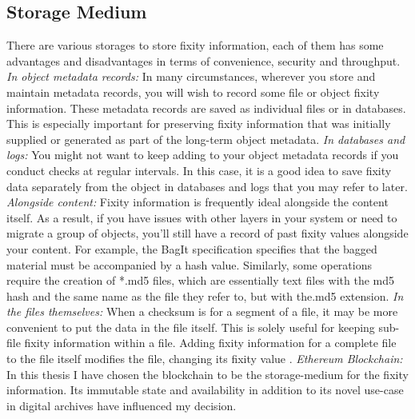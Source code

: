 \subsection{Storage Medium}
\label{sec:storage-medium}
There are various storages to store fixity information, each of them has some advantages and disadvantages in terms of convenience, security and throughput.
\newline \textit{In object metadata records:} In many circumstances, wherever you store and maintain metadata records, you will wish to record some file or object fixity information. These metadata records are saved as individual files or in databases. This is especially important for preserving fixity information that was initially supplied or generated as part of the long-term object metadata. 
\newline \textit{In databases and logs:} You might not want to keep adding to your object metadata records if you conduct checks at regular intervals. In this case, it is a good idea to save fixity data separately from the object in databases and logs that you may refer to later.
\newline \textit{Alongside content:} Fixity information is frequently ideal alongside the content itself. As a result, if you have issues with other layers in your system or need to migrate a group of objects, you'll still have a record of past fixity values alongside your content. For example, the BagIt specification specifies that the bagged material must be accompanied by a hash value. Similarly, some operations require the creation of *.md5 files, which are essentially text files with the md5 hash and the same name as the file they refer to, but with the.md5 extension.
\newline \textit{In the files themselves:} When a checksum is for a segment of a file, it may be more convenient to put the data in the file itself. This is solely useful for keeping sub-file fixity information within a file. Adding fixity information for a complete file to the file itself modifies the file, changing its fixity value \cite[6]{ndsa2014fixity}.
\newline \textit{Ethereum Blockchain:} In this thesis I have chosen the blockchain to be the storage-medium for the fixity information. Its immutable state and availability in addition to its novel use-case in digital archives have influenced my decision.
